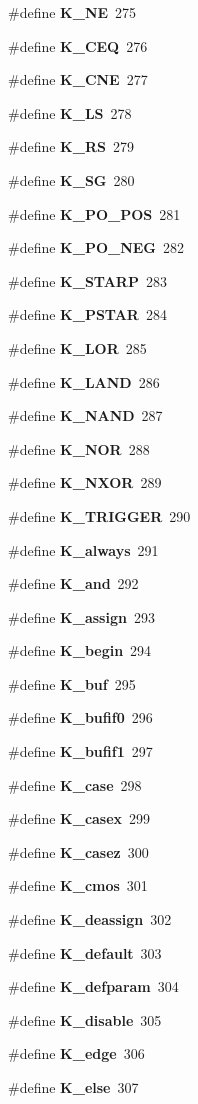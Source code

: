 \begin{CompactItemize}
\item 
\#define {\bf K\_\-NE}\ 275
\item 
\#define {\bf K\_\-CEQ}\ 276
\item 
\#define {\bf K\_\-CNE}\ 277
\item 
\#define {\bf K\_\-LS}\ 278
\item 
\#define {\bf K\_\-RS}\ 279
\item 
\#define {\bf K\_\-SG}\ 280
\item 
\#define {\bf K\_\-PO\_\-POS}\ 281
\item 
\#define {\bf K\_\-PO\_\-NEG}\ 282
\item 
\#define {\bf K\_\-STARP}\ 283
\item 
\#define {\bf K\_\-PSTAR}\ 284
\item 
\#define {\bf K\_\-LOR}\ 285
\item 
\#define {\bf K\_\-LAND}\ 286
\item 
\#define {\bf K\_\-NAND}\ 287
\item 
\#define {\bf K\_\-NOR}\ 288
\item 
\#define {\bf K\_\-NXOR}\ 289
\item 
\#define {\bf K\_\-TRIGGER}\ 290
\item 
\#define {\bf K\_\-always}\ 291
\item 
\#define {\bf K\_\-and}\ 292
\item 
\#define {\bf K\_\-assign}\ 293
\item 
\#define {\bf K\_\-begin}\ 294
\item 
\#define {\bf K\_\-buf}\ 295
\item 
\#define {\bf K\_\-bufif0}\ 296
\item 
\#define {\bf K\_\-bufif1}\ 297
\item 
\#define {\bf K\_\-case}\ 298
\item 
\#define {\bf K\_\-casex}\ 299
\item 
\#define {\bf K\_\-casez}\ 300
\item 
\#define {\bf K\_\-cmos}\ 301
\item 
\#define {\bf K\_\-deassign}\ 302
\item 
\#define {\bf K\_\-default}\ 303
\item 
\#define {\bf K\_\-defparam}\ 304
\item 
\#define {\bf K\_\-disable}\ 305
\item 
\#define {\bf K\_\-edge}\ 306
\item 
\#define {\bf K\_\-else}\ 307
\item 

\end{CompactItemize}
